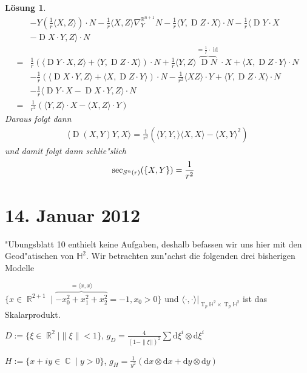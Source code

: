 \documentclass[paper=A4, twoside, chapterprefix=true, bibliography=totoc, headsepline]{scrbook}
\DeclareMathOperator{\C}{\mathbb{C}}
\DeclareMathOperator{\R}{\mathbb{R}}
\renewcommand{\H}{\ensuremath{\mathbb{H}}}
\DeclareMathOperator{\id}{id}       %
\DeclareMathOperator{\D}{D}         %
\DeclareMathOperator{\T}{T}         %
\newcommand{\dop}{\mathrm{d}}
\newcommand{\X}{\times}
\theoremstyle{plain}
\theoremstyle{nonumberplain}
\theoremstyle{empty}
\theoremstyle{break}
\newtheorem{Loes}{L\"osung}
\begin{document}
\begin{Loes}
\begin{align*}
		& - Y ( \frac{1}{r} \langle X, Z \rangle ) \cdot N - \frac{1}{r} \langle X, Z \rangle \nabla_Y^{\R^{n+1}} N - \frac{1}{r} \langle Y, \D Z \cdot X \rangle \cdot N - \frac{1}{r} \langle \D Y \cdot X\\
		& - \D X \cdot Y, Z \rangle \cdot N\\
	={}& \frac{1}{r} ( \langle \D Y \cdot X, Z \rangle + \langle Y, \D Z \cdot X \rangle ) \cdot N + \frac{1}{r} \langle Y, Z \rangle \overbrace{\D N}^{= \frac{1}{r} \cdot \id} \cdot X + \langle X, \D Z \cdot Y \rangle \cdot N\\
		& - \frac{1}{r} ( \langle \D X \cdot Y, Z \rangle + \langle X, \D Z \cdot Y \rangle ) \cdot N - \frac{1}{r^2} \langle X Z \rangle \cdot Y + \langle Y, \D Z \cdot X \rangle \cdot N\\
		& - \frac{1}{r} \langle \D Y \cdot X - \D X \cdot Y, Z \rangle \cdot N\\
	={}& \frac{1}{r^2} ( \langle Y, Z \rangle \cdot X - \langle X, Z \rangle \cdot Y)
\end{align*}
Daraus folgt dann
\begin{align*}
	\langle \D(X,Y) Y, X \rangle = \frac{1}{r^2} ( \langle Y, Y, \rangle \langle X, X \rangle - \langle X, Y \rangle^2)
\end{align*}
und damit folgt dann schlie"slich
\begin{align*}
\sec_{S^n(r)}(\span\{X,Y\}) = \frac{1}{r^2}
\end{align*}
\end{Loes}


\section{14. Januar 2012}
\setcounter{Aufg}{0} %
\setcounter{Loes}{0}

"Ubungsblatt 10 enthielt keine Aufgaben, deshalb befassen wir uns hier mit den Geod"atischen von $\H^2$.
Wir betrachten zun"achst die folgenden drei bisherigen Modelle \begin{description}[leftmargin=*]
\item[Hyperboloid:]
	$\{ x \in \R^{2+1} \mid \overbrace{-x_0^2 + x_1^2 + x_2^2}^{= \langle x,x \rangle} = -1, x_0 > 0 \}$ und $\langle \cdot, \cdot \rangle|_{\T_p\H^2 \X \T_p\H^2}$ ist das Skalarprodukt.
\item[Poincare Kreisscheibenmodell:]
	$D := \{ \xi \in \R^2 \mid \|\xi\| < 1 \}$, $g_D = \frac{4}{(1 - \|\xi||)^2} \sum \dop \xi^{i} \otimes \dop \xi^{i}$
\item[Poincare obere Halbebene Modell:]
	$H := \{ x + iy \in \C \mid y > 0 \}$, $g_H = \frac{1}{y^2}(\dop x \otimes \dop x + \dop y \otimes \dop y)$
\end{description}
\end{document}
